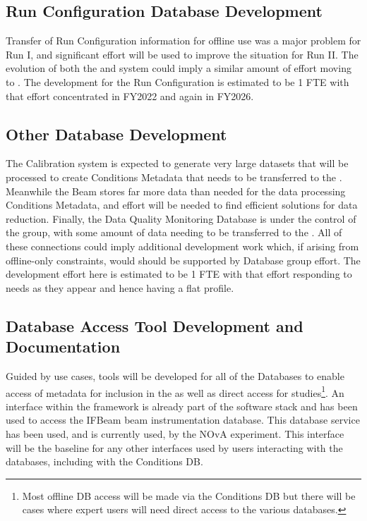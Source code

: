 \documentclass[../main-v1.tex]{subfiles}
\begin{document}
\subsection{Run Configuration Database Development}

Transfer of Run Configuration information for offline use was a major problem for  Run I, and significant effort will be used to improve the situation for Run II.  The evolution of both the   and  system could imply a similar amount of effort moving to .
The development for the Run Configuration  is estimated to be 1 FTE with that effort concentrated in FY2022 and again in FY2026.

\subsection{Other Database Development}

The  Calibration system is expected to generate very large datasets that will be processed to create Conditions Metadata that needs to be transferred to the .  Meanwhile the Beam  stores far more data than needed for the data processing Conditions Metadata, and effort will be needed to find efficient solutions for data reduction.  Finally, the Data Quality Monitoring Database is under the control of the  group, with some amount of data needing to be transferred to the .  All of these connections could imply additional development work which, if arising from offline-only constraints, would should be supported by Database group effort.
The development effort here is estimated to be 1 FTE with that effort responding to needs as they appear and hence having a flat profile.

\subsection{Database Access Tool Development and Documentation}

Guided by use cases, tools will be developed for all of the  Databases to enable access of metadata for inclusion in the  as well as direct access for studies\footnote{Most offline DB access will be made via the Conditions DB but there will be cases where expert users will need direct access to the various databases.}. An interface within the  framework is already part of the  software stack and has been used to access the IFBeam beam instrumentation database. This  database service has been used, and is currently used, by the NOvA experiment. This interface will be the baseline for any other interfaces used by users interacting with the  databases, including with the Conditions DB.
\end{document}
